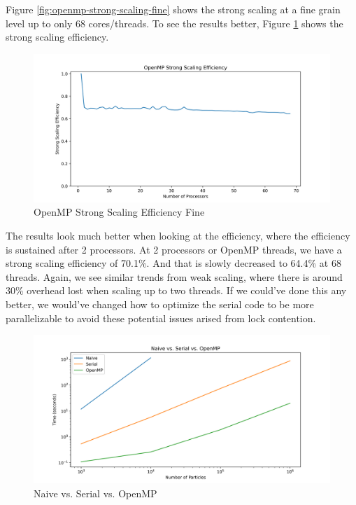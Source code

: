 \documentclass{article}
\begin{document}
Figure \ref{fig:openmp-strong-scaling-fine} shows the strong scaling at a fine grain level up to only 68 cores/threads. To see the results better, Figure \ref{fig:openmp-strong-scaling-efficiency-fine} shows the strong scaling efficiency.

\begin{figure}[H]
	\centering
	\includegraphics[width=6in]{figures/openmp_strong_scaling_efficiency_fine.png}
	\caption{OpenMP Strong Scaling Efficiency Fine}
	\label{fig:openmp-strong-scaling-efficiency-fine}
\end{figure}

The results look much better when looking at the efficiency, where the efficiency is sustained after 2 processors. At 2 processors or OpenMP threads, we have a strong scaling efficiency of 70.1\%. And that is slowly decreased to 64.4\% at 68 threads. Again, we see similar trends from weak scaling, where there is around 30\% overhead lost when scaling up to two threads. If we could've done this any better, we would've changed how to optimize the serial code to be more parallelizable to avoid these potential issues arised from lock contention.

\begin{figure}[H]
	\centering
	\includegraphics[width=6in]{figures/openmp_compared.png}
	\caption{Naive vs. Serial vs. OpenMP}
	\label{fig:openmp-compared}
\end{figure}
\end{document}
